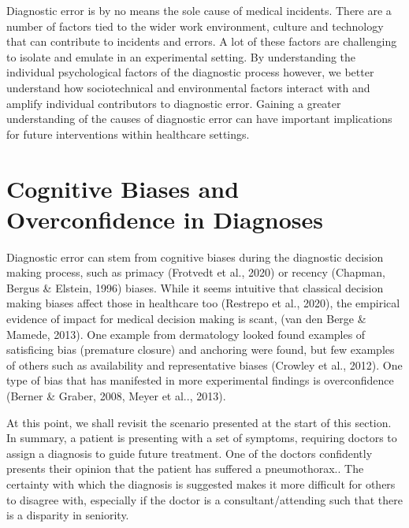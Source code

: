 \documentclass[a4paper, nobind]{templates/ociamthesis}
\begin{document}
Diagnostic error is by no means the sole cause of medical incidents. There are a number of factors tied to the wider work environment, culture and technology that can contribute to incidents and errors. A lot of these factors are challenging to isolate and emulate in an experimental setting. By understanding the individual psychological factors of the diagnostic process however, we better understand how sociotechnical and environmental factors interact with and amplify individual contributors to diagnostic error. Gaining a greater understanding of the causes of diagnostic error can have important implications for future interventions within healthcare settings.

\section*{Cognitive Biases and Overconfidence in Diagnoses}\label{cognitive-biases-and-overconfidence-in-diagnoses}

Diagnostic error can stem from cognitive biases during the diagnostic decision making process, such as primacy (Frotvedt et al., 2020) or recency (Chapman, Bergus \& Elstein, 1996) biases. While it seems intuitive that classical decision making biases affect those in healthcare too (Restrepo et al., 2020), the empirical evidence of impact for medical decision making is scant, (van den Berge \& Mamede, 2013). One example from dermatology looked found examples of satisficing bias (premature closure) and anchoring were found, but few examples of others such as availability and representative biases (Crowley et al., 2012). One type of bias that has manifested in more experimental findings is overconfidence (Berner \& Graber, 2008, Meyer et al.., 2013).

At this point, we shall revisit the scenario presented at the start of this section. In summary, a patient is presenting with a set of symptoms, requiring doctors to assign a diagnosis to guide future treatment. One of the doctors confidently presents their opinion that the patient has suffered a pneumothorax.. The certainty with which the diagnosis is suggested makes it more difficult for others to disagree with, especially if the doctor is a consultant/attending such that there is a disparity in seniority.
\end{document}
